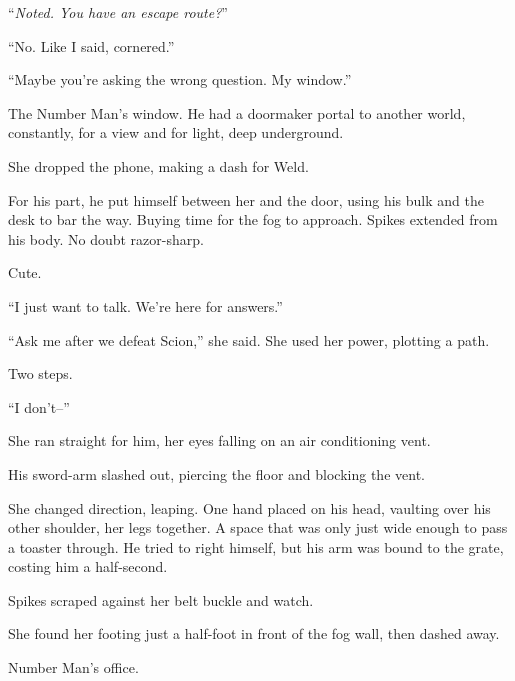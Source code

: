 ``\emph{Noted.  You have an escape route?}''



``No.  Like I said, cornered.''



``Maybe you're asking the wrong question.  My window.''



The Number Man's window.  He had a doormaker portal to another world, constantly, for a view and for light, deep underground.



She dropped the phone, making a dash for Weld.



For his part, he put himself between her and the door, using his bulk and the desk to bar the way.  Buying time for the fog to approach.  Spikes extended from his body.  No doubt razor-sharp.



Cute.



``I just want to talk.  We're here for answers.''



``Ask me after we defeat Scion,'' she said.  She used her power, plotting a path.



Two steps.



``I don't--''



She ran straight for him, her eyes falling on an air conditioning vent.



His sword-arm slashed out, piercing the floor and blocking the vent.



She changed direction, leaping.  One hand placed on his head, vaulting over his other shoulder, her legs together.  A space that was only just wide enough to pass a toaster through.  He tried to right himself, but his arm was bound to the grate, costing him a half-second.



Spikes scraped against her belt buckle and watch.



She found her footing just a half-foot in front of the fog wall, then dashed away.



Number Man's office.




